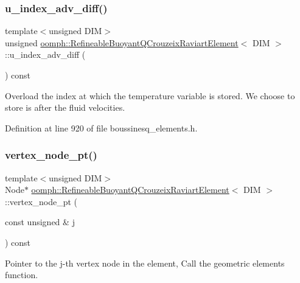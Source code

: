 \subsubsection{\texorpdfstring{u\+\_\+index\+\_\+adv\+\_\+diff()}{u\_index\_adv\_diff()}}
{\footnotesize\ttfamily template$<$unsigned D\+IM$>$ \\
unsigned \hyperlink{classoomph_1_1RefineableBuoyantQCrouzeixRaviartElement}{oomph\+::\+Refineable\+Buoyant\+Q\+Crouzeix\+Raviart\+Element}$<$ D\+IM $>$\+::u\+\_\+index\+\_\+adv\+\_\+diff (\begin{DoxyParamCaption}{ }\end{DoxyParamCaption}) const\hspace{0.3cm}{\ttfamily [inline]}}



Overload the index at which the temperature variable is stored. We choose to store is after the fluid velocities. 



Definition at line 920 of file boussinesq\+\_\+elements.\+h.

\mbox{\label{classoomph_1_1RefineableBuoyantQCrouzeixRaviartElement_a39d79b2fe742148c2d3856ed05ad78db}} 
\subsubsection{\texorpdfstring{vertex\+\_\+node\+\_\+pt()}{vertex\_node\_pt()}}
{\footnotesize\ttfamily template$<$unsigned D\+IM$>$ \\
Node$\ast$ \hyperlink{classoomph_1_1RefineableBuoyantQCrouzeixRaviartElement}{oomph\+::\+Refineable\+Buoyant\+Q\+Crouzeix\+Raviart\+Element}$<$ D\+IM $>$\+::vertex\+\_\+node\+\_\+pt (\begin{DoxyParamCaption}\item[{const unsigned \&}]{j }\end{DoxyParamCaption}) const\hspace{0.3cm}{\ttfamily [inline]}}



Pointer to the j-\/th vertex node in the element, Call the geometric element\textquotesingle{}s function. 



